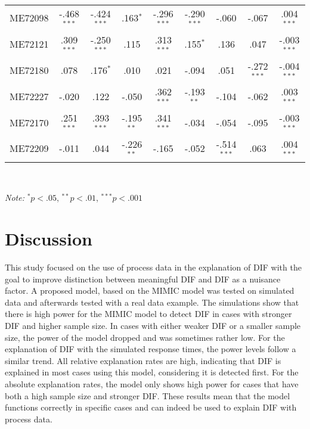 \documentclass{interact}
\begin{document}
\begin{landscape}
\begin{table}[hp]
\begin{tabular}{c | c c c c c c c c}
      ME72098 & -.468$^{***}$ & -.424$^{***}$ & .163$^{*}$ & -.296$^{***}$ & -.290$^{***}$ & -.060 & -.067 & .004$^{***}$\\
      ME72121 & .309$^{***}$ & -.250$^{***}$ & .115 & .313$^{***}$ & .155$^{*}$ & .136 & .047 & -.003$^{***}$ \\
      ME72180 & .078 & .176$^{*}$ & .010 & .021 & -.094 & .051 & -.272$^{***}$ & -.004$^{***}$ \\
      ME72227 & -.020 & .122 & -.050 & .362$^{***}$ & -.193$^{**}$ & -.104 & -.062 & .003$^{***}$\\
      ME72170 & .251$^{***}$ & .393$^{***}$ & -.195$^{**}$ & .341$^{***}$ & -.034 & -.054 & -.095 & -.003$^{***}$\\
      ME72209 & -.011 & .044 & -.226$^{**}$ & -.165 & -.052 & -.514$^{***}$ & .063 & .004$^{***}$\\
      \hline\hline
    \end{tabular}\\
    \begin{flushleft}
    \footnotesize{\hspace{.3cm}\textit{Note:} $^* p<.05$, $^{**} p<.01$, $^{***} p<.001$ }\\
    \end{flushleft}
\end{table}
\end{landscape}
\pagestyle{plain}

\section{Discussion}
\label{sec: 5 discussion}

This study focused on the use of process data in the explanation of DIF with the goal to improve distinction between meaningful DIF and DIF as a nuisance factor. A proposed model, based on the MIMIC model was tested on simulated data and afterwards tested with a real data example. The simulations show that there is high power for the MIMIC model to detect DIF in cases with stronger DIF and higher sample size. In cases with either weaker DIF or a smaller sample size, the power of the model dropped and was sometimes rather low. For the explanation of DIF with the simulated response times, the power levels follow a similar trend. All relative explanation rates are high, indicating that DIF is explained in most cases using this model, considering it is detected first. For the absolute explanation rates, the model only shows high power for cases that have both a high sample size and stronger DIF. These results mean that the model functions correctly in specific cases and can indeed be used to explain DIF with process data.
\end{document}
